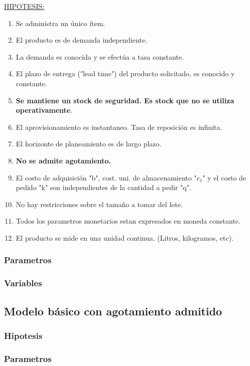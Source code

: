\documentclass{article}
\begin{document}
\underline{HIPOTESIS:}
\begin{enumerate}
    \item Se administra un único ítem.
    \item El producto es de demanda independiente.
    \item La demanda es conocida y se efectúa a tasa constante.
    \item El plazo de entrega ("lead time") del producto solicitado, es conocido y constante.
    \item \textbf{Se mantiene un stock de seguridad. Es stock que no se utiliza operativamente}.
    \item El aprovisionamiento es instantaneo. Tasa de reposición es infinita.
    \item El horizonte de planeamiento es de largo plazo.
    \item \textbf{No se admite agotamiento.}
    \item El costo de adquisición "b", cost. uni. de almacenamiento "\(c_1\)" y el costo de pedido "k" son independientes de la cantidad a pedir "q".
    \item No hay restricciones sobre el tamaño a tomar del lote.
    \item Todos los parametros monetarios estan expresados en moneda constante.
    \item El producto se mide en una unidad continua. (Litros, kilogramos, etc).
\end{enumerate}



\subsubsection{Parametros}

\subsubsection{Variables}

\subsection{Modelo básico con agotamiento admitido}


\subsubsection{Hipotesis}

\subsubsection{Parametros}
\end{document}
